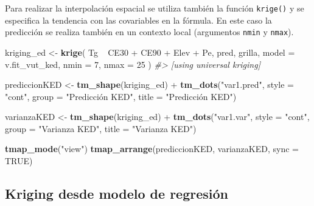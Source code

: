 \documentclass[11pt,b5paper,]{krantz}
\newenvironment{Shaded}{}{}
\newcommand{\CommentTok}[1]{\textcolor[rgb]{0.38,0.63,0.69}{\textit{#1}}}
\newcommand{\DataTypeTok}[1]{\textcolor[rgb]{0.56,0.13,0.00}{#1}}
\newcommand{\DecValTok}[1]{\textcolor[rgb]{0.25,0.63,0.44}{#1}}
\newcommand{\KeywordTok}[1]{\textcolor[rgb]{0.00,0.44,0.13}{\textbf{#1}}}
\newcommand{\NormalTok}[1]{#1}
\newcommand{\OperatorTok}[1]{\textcolor[rgb]{0.40,0.40,0.40}{#1}}
\newcommand{\OtherTok}[1]{\textcolor[rgb]{0.00,0.44,0.13}{#1}}
\newcommand{\StringTok}[1]{\textcolor[rgb]{0.25,0.44,0.63}{#1}}
\begin{document}
Para realizar la interpolación espacial se utiliza también la función \texttt{krige()} y se especifica la tendencia con las covariables en la fórmula. En este caso la predicción se realiza también en un contexto local (argumentos \texttt{nmin} y \texttt{nmax}).

\begin{Shaded}
\begin{Highlighting}[]
\NormalTok{kriging_ed <-}\StringTok{ }\KeywordTok{krige}\NormalTok{(}
\NormalTok{  Tg }\OperatorTok{~}\StringTok{ }\NormalTok{CE30 }\OperatorTok{+}\StringTok{ }\NormalTok{CE90 }\OperatorTok{+}\StringTok{ }\NormalTok{Elev }\OperatorTok{+}\StringTok{ }\NormalTok{Pe,}
\NormalTok{  pred,}
\NormalTok{  grilla,}
  \DataTypeTok{model =}\NormalTok{ v.fit_vut_ked,}
  \DataTypeTok{nmin =} \DecValTok{7}\NormalTok{,}
  \DataTypeTok{nmax =} \DecValTok{25}
\NormalTok{)}
\CommentTok{#> [using universal kriging]}
\end{Highlighting}
\end{Shaded}

\begin{Shaded}
\begin{Highlighting}[]

\NormalTok{prediccionKED <-}
\StringTok{  }\KeywordTok{tm_shape}\NormalTok{(kriging_ed) }\OperatorTok{+}
\StringTok{  }\KeywordTok{tm_dots}\NormalTok{(}\StringTok{"var1.pred"}\NormalTok{, }\DataTypeTok{style =} \StringTok{"cont"}\NormalTok{,}
          \DataTypeTok{group =} \StringTok{"Predicción KED"}\NormalTok{,}
          \DataTypeTok{title =} \StringTok{"Predicción KED"}\NormalTok{)}

\NormalTok{varianzaKED <-}
\StringTok{  }\KeywordTok{tm_shape}\NormalTok{(kriging_ed) }\OperatorTok{+}
\StringTok{  }\KeywordTok{tm_dots}\NormalTok{(}\StringTok{"var1.var"}\NormalTok{, }\DataTypeTok{style =} \StringTok{"cont"}\NormalTok{,}
          \DataTypeTok{group =} \StringTok{"Varianza KED"}\NormalTok{,}
          \DataTypeTok{title =} \StringTok{"Varianza KED"}\NormalTok{) }

\KeywordTok{tmap_mode}\NormalTok{(}\StringTok{"view"}\NormalTok{)}
\KeywordTok{tmap_arrange}\NormalTok{(prediccionKED, varianzaKED, }\DataTypeTok{sync =} \OtherTok{TRUE}\NormalTok{)}
\end{Highlighting}
\end{Shaded}

\hypertarget{htmlwidget-3797}{}

\hypertarget{htmlwidget-1163}{}

\hypertarget{kriging-desde-modelo-de-regresiuxf3n}{%
\subsection{Kriging desde modelo de regresión}\label{kriging-desde-modelo-de-regresiuxf3n}}
\end{document}
